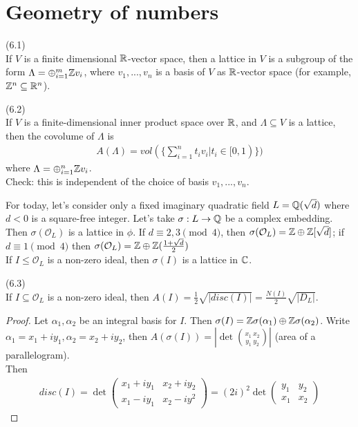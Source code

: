 \documentclass[a4paper]{article}
\begin{document}
\newpage
\section{Geometry of numbers}

\begin{defi} (6.1)\\
If $V$ is a finite dimensional $\mathbb{R}$-vector space, then a lattice in $V$ is a subgroup of the form $\Lambda = \oplus_{i=1}^m \mathbb{Z} v_i$, where $v_1,...,v_n$ is a basis of $V$ as $\mathbb{R}$-vector space (for example, $\mathbb{Z}^n \subseteq \mathbb{R}^n$).
\end{defi}

\begin{defi} (6.2)\\
If $V$ is a finite-dimensional inner product space over $\mathbb{R}$, and $\Lambda \subseteq V$ is a lattice, then the covolume of $\Lambda$ is 
\begin{equation*}
\begin{aligned}
A(\Lambda) = vol(\{\sum_{i=1}^n t_i v_i | t_i \in [0,1)\})
\end{aligned}
\end{equation*}
where $\Lambda = \oplus_{i=1}^n \mathbb{Z} v_i$.\\
Check: this is independent of the choice of basis $v_1,...,v_n$.
\end{defi}

For today, let's consider only a fixed imaginary quadratic field $L = \mathbb{Q}(\sqrt{d})$ where $d<0$ is a square-free integer. Let's take $\sigma:L \to \mathbb{Q}$ be a complex embedding. Then $\sigma(\mathcal{O}_L)$ is a lattice in $\phi$. If $d \equiv 2,3 \pmod 4$, then $\sigma(\mathcal{O}_L) = \mathbb{Z} \oplus \mathbb{Z} [\sqrt{d}]$; if $d \equiv 1 \pmod 4$ then $\sigma(\mathcal{O}_L) = \mathbb{Z} \oplus \mathbb{Z} (\frac{1+\sqrt{d}}{2})$\\
If $I \leq \mathcal{O}_L$ is a non-zero ideal, then $\sigma(I)$ is a lattice in $\mathbb{C}$.

\begin{lemma} (6.3)\\
If $I \subseteq \mathcal{O}_L$ is a non-zero ideal, then $A(I) = \frac{1}{2} \sqrt{|disc(I)|} = \frac{N(I)}{2} \sqrt{|D_L|}$.
\begin{proof}
Let $\alpha_1,\alpha_2$ be an integral basis for $I$. Then $\sigma(I) = \mathbb{Z} \sigma(\alpha_1) \oplus \mathbb{Z} \sigma (\alpha_2)$. Write $\alpha_1 = x_1+iy_1,\alpha_2=x_2+iy_2$, then $A(\sigma(I)) = |\det{{x_1 \ x_2} \choose {y_1 \ y_2}}|$ (area of a parallelogram).\\
Then 
\begin{equation*}
\begin{aligned}
disc(I) = \det 
\begin{pmatrix}
x_1+iy_1 & x_2 + iy_2\\
x_1 - iy_1 & x_2 - iy^2
\end{pmatrix} 
= 
(2i)^2 \det 
\begin{pmatrix}
y_1 & y_2\\
x_1 & x_2
\end{pmatrix}
\end{aligned}
\end{equation*}
\end{proof}
\end{lemma}
\end{document}
